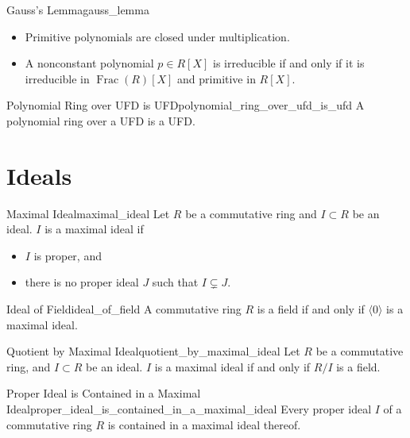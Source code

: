 \documentclass{article}
\begin{document}
\begin{lemma}{Gauss's Lemma}{gauss_lemma}
    \begin{itemize}
        \item Primitive polynomials are closed under multiplication.
        \item A nonconstant polynomial $p\in R[X]$ is irreducible if and only if it is irreducible in $\operatorname{Frac}(R)[X]$ and primitive in $R[X]$.
    \end{itemize}
\end{lemma}

\begin{theorem}{Polynomial Ring over UFD is UFD}{polynomial_ring_over_ufd_is_ufd}
    A polynomial ring over a UFD is a UFD.
\end{theorem}

\section{Ideals}

\begin{definition}{Maximal Ideal}{maximal_ideal}
    Let $R$ be a commutative ring and $I\subset R$ be an ideal.
    $I$ is a maximal ideal if
    \begin{itemize}
        \item $I$ is proper, and
        \item there is no proper ideal $J$ such that $I\subsetneq J$.
    \end{itemize}
\end{definition}

\begin{proposition}{Ideal of Field}{ideal_of_field}
    A commutative ring $R$ is a field if and only if $\langle 0 \rangle$ is a maximal ideal.
\end{proposition}

\begin{corollary}{Quotient by Maximal Ideal}{quotient_by_maximal_ideal}
    Let $R$ be a commutative ring, and $I\subset R$ be an ideal.
    $I$ is a maximal ideal if and only if $R/I$ is a field.
\end{corollary}

\begin{theorem}{Proper Ideal is Contained in a Maximal Ideal}{proper_ideal_is_contained_in_a_maximal_ideal}
    Every proper ideal $I$ of a commutative ring $R$ is contained in a maximal ideal thereof.
\end{theorem}
\end{document}
